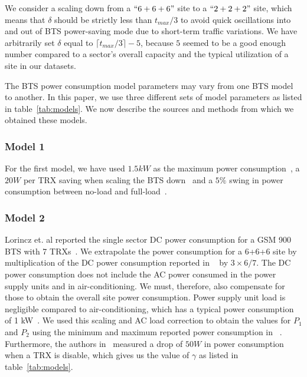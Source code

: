 We consider a scaling down from a $``6+6+6"$ site to a $``2+2+2"$ site, which means that $\delta$ should be strictly less than $t_{max}/3$ to avoid quick oscillations into and out of BTS power-saving mode due to short-term traffic variations. We have arbitrarily set $\delta$ equal to $\lceil t_{max}/3\rceil -5$, because $5$ seemed to be a good enough number compared to a sector's overall capacity and the typical utilization of a site in our datasets.

The BTS power consumption model parameters may vary from one BTS model to another. In this paper, we use three different sets of model parameters as listed in table~\ref{tab:models}. We now describe the sources and methods from which we obtained these models.
\subsubsection{Model 1}
\label{subsubsec:case2:experiments:sitetypes:model1}For the first model, we have used $1.5kW$ as the maximum power consumption~\cite{mbakwe:btshybribpower:2011:necec}, a $20W$ per TRX saving when scaling the BTS down~\cite{flexibsc} and a $5\%$ swing in power consumption between no-load and full-load~\cite{Peng:2011:BTSSaving:Mobicom}.

\subsubsection{Model 2}
\label{subsubsec:case2:experiments:sitetypes:model2} Lorincz et. al reported the single sector DC power consumption for a GSM 900 BTS with 7 TRXs~\cite{Lorincz:BTS-Measure:Sensors:2012}. We extrapolate the power consumption for a 6+6+6 site by multiplication of the DC power consumption reported in ~\cite{Lorincz:BTS-Measure:Sensors:2012} by $3\times6/7$. The DC power consumption does not include the AC power consumed in the power supply units and in air-conditioning. We must, therefore, also compensate for those to obtain the overall site power consumption. Power supply unit load is negligible compared to air-conditioning, which has a typical power consumption of 1 kW~\cite{mbakwe:btshybribpower:2011:necec}. We used this scaling and AC load correction to obtain the values for $P_1$ and $P_2$ using the minimum and maximum reported power consumption in ~\cite{Lorincz:BTS-Measure:Sensors:2012}. Furthermore, the authors in~\cite{Lorincz:BTS-Measure:Sensors:2012} measured a drop of $50W$ in power consumption when a TRX is disable, which gives us the value of $\gamma$ as listed in table~\ref{tab:models}.

